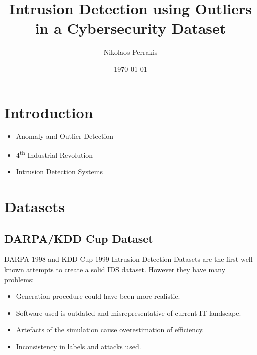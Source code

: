 \documentclass{beamer}
\title{Intrusion Detection using Outliers in a Cybersecurity Dataset}
\author{Nikolaos Perrakis}
\date{\today}
\begin{document}
\frame{\titlepage}

\section[Outline]{}
\frame{\tableofcontents}

\section{Introduction}
\frame
{

  \begin{itemize}
  \item Anomaly and Outlier Detection
  \item 4\textsuperscript{th} Industrial Revolution
  \item Intrusion Detection Systems
  \end{itemize}
}

\section{Datasets}
\subsection{DARPA/KDD Cup Dataset}
\frame
{
DARPA 1998 and KDD Cup 1999 Intrusion Detection Datasets are the first well known attempts to create a solid IDS dataset. However they have many problems\cite{ids3}:
\begin{itemize}
\item Generation procedure could have been more realistic.
\item Software used is outdated and misrepresentative of current IT landscape.
\item Artefacts of the simulation cause overestimation of efficiency.
\item Inconsistency in labels and attacks used.
\end{itemize}
}
\end{document}
